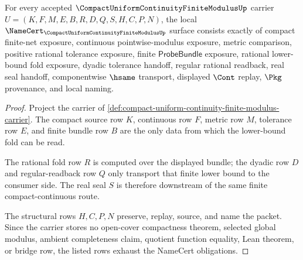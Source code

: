 \begin{theorem}
\label{thm:compact-uniform-continuity-finite-modulus-obligations}
For every accepted $\CompactUniformContinuityFiniteModulusUp$ carrier $U=(K,F,M,E,B,R,D,Q,S,H,C,P,N)$, the local $\NameCert_{\CompactUniformContinuityFiniteModulusUp}$ surface consists exactly of compact finite-net exposure, continuous pointwise-modulus exposure, metric comparison, positive rational tolerance exposure, finite $\mathsf{ProbeBundle}$ exposure, rational lower-bound fold exposure, dyadic tolerance handoff, regular rational readback, real seal handoff, componentwise $\hsame$ transport, displayed $\Cont$ replay, $\Pkg$ provenance, and local naming.
\end{theorem}
\begin{proof}
Project the carrier of \autoref{def:compact-uniform-continuity-finite-modulus-carrier}. The compact source row $K$, continuous row $F$, metric row $M$, tolerance row $E$, and finite bundle row $B$ are the only data from which the lower-bound fold can be read.

The rational fold row $R$ is computed over the displayed bundle; the dyadic row $D$ and regular-readback row $Q$ only transport that finite lower bound to the consumer side. The real seal $S$ is therefore downstream of the same finite compact-continuous route.

The structural rows $H,C,P,N$ preserve, replay, source, and name the packet. Since the carrier stores no open-cover compactness theorem, selected global modulus, ambient completeness claim, quotient function equality, Lean theorem, or bridge row, the listed rows exhaust the NameCert obligations.
\end{proof}

